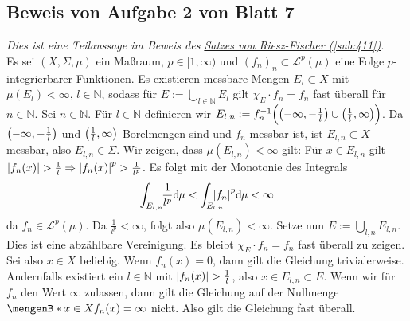 \subsection{Beweis von Aufgabe 2 von Blatt 7} %
\label{sub:blatt7_aufg2}
\emph{Dies ist eine Teilaussage im Beweis des \hyperref[sub:411]{Satzes von Riesz-Fischer (\ref*{sub:411})}.}\\
Es sei $(X,\Sigma,\mu)$ ein Maßraum, $p \in [1,\infty)$ und $(f_n)_n \subset \mathcal{L}^p(\mu)$ eine Folge $p$-integrierbarer Funktionen.
Es existieren messbare Mengen $E_l \subset X$ mit $\mu(E_l)< \infty$, $l \in \mathds{N}$, sodass für $E := \bigcup_{l \in \mathds{N}}E_l$ gilt $\chi_E \cdot f_n = f_n$ fast
überall für $n \in \mathds{N}$.
Sei $n \in \mathds{N}$. Für $l \in \mathds{N}$ definieren wir
\(
	E_{l,n} := f_n^{-1}\enbrace[\Big]{\enbrace*{-\infty,-\frac{1}{l}} \cup \enbrace*{\frac{1}{l},\infty} } 
\).
Da $\enbrace*{-\infty,-\frac{1}{l}}$ und $\enbrace*{\frac{1}{l},\infty}$ Borelmengen sind und $f_n$ messbar ist, ist $E_{l,n}\subset X$ messbar, also $E_{l,n} \in \Sigma$.
Wir zeigen, dass $\mu(E_{l,n})<\infty$ gilt: Für $x \in E_{l,n}$ gilt $\abs*{f_n(x)} > \frac{1}{l} \Rightarrow \abs*{f_n(x)}^p > \frac{1}{l^p}$. Es folgt mit der Monotonie 
des Integrals
\begin{align*}
	\int_{E_{l,n}} \!\! \frac{1}{l^p} \mathd\mu < \int_{E_{l,n}} \hspace{-1em}\abs*{f_n}^p\mathd\mu < \infty
\end{align*}
da $f_n \in \mathcal{L}^p(\mu)$. Da $\frac{1}{l^p}<\infty $, folgt also $\mu(E_{l,n})<\infty$. Setze nun $E := \bigcup_{l,n} E_{l,n}$. Dies ist eine abzählbare Vereinigung.
Es bleibt $\chi_E \cdot f_n = f_n$ fast überall zu zeigen. Sei also $x \in X$ beliebig. Wenn $f_n(x)=0$, dann gilt die Gleichung trivialerweise. Andernfalls existiert ein 
$l \in \mathds{N}$ mit $\abs*{f_n(x)} > \frac{1}{l}$, also $x \in E_{l,n} \subset E$. Wenn wir für $f_n$ den Wert $\infty$ zulassen, dann gilt die Gleichung auf der Nullmenge
$\set[x \in X]{f_n(x)=\infty}$ nicht. Also gilt die Gleichung fast überall. \bewende

\cleardoubleoddemptypage
{}
\setcounter{page}{1}
\printindex
\listoffigures
\todototoc
{}
